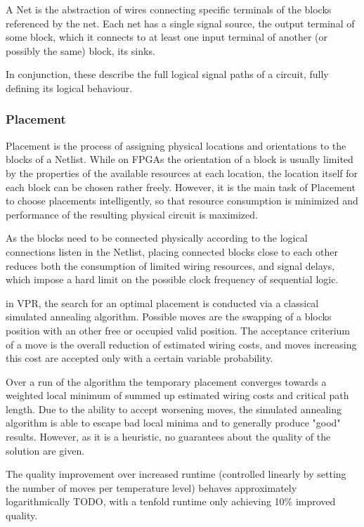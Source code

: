 A Net is the abstraction of wires connecting specific terminals of the blocks referenced by the net. Each net has a single signal source, the output terminal of some block, which it connects to at least one input terminal of another (or possibly the same) block, its sinks.

In conjunction, these describe the full logical signal paths of a circuit, fully defining its logical behaviour.

\subsubsection{Placement}

Placement is the process of assigning physical locations and orientations to the blocks of a Netlist. While on \glspl{FPGA} the orientation of a block is usually limited by the properties of the available resources at each location, the location itself for each block can be chosen rather freely. However, it is the main task of Placement to choose placements intelligently, so that resource consumption is minimized and performance of the resulting physical circuit is maximized.

As the blocks need to be connected physically according to the logical connections listen in the Netlist, placing connected blocks close to each other reduces both the consumption of limited wiring resources, and signal delays, which impose a hard limit on the possible clock frequency of sequential logic.

in \gls{VPR}, the search for an optimal placement is conducted via a classical simulated annealing algorithm. Possible moves are the swapping of a blocks position with an other free or occupied valid position. The acceptance criterium of a move is the overall reduction of estimated wiring costs, and moves increasing this cost are accepted only with a certain variable probability.

Over a run of the algorithm the temporary placement converges towards a weighted local minimum of summed up estimated wiring costs and critical path length. Due to the ability to accept worsening moves, the simulated annealing algorithm is able to escape bad local minima and to generally produce "good" results. However, as it is a heuristic, no guarantees about the quality of the solution are given.

The quality improvement over increased runtime (controlled linearly by setting the number of moves per temperature level) behaves approximately logarithmically TODO, with a tenfold runtime only achieving 10\% improved quality.\cite{TODO}

